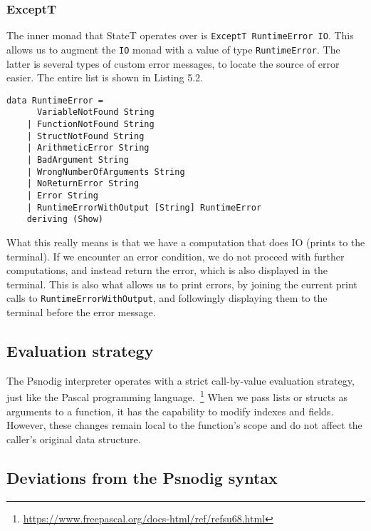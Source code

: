 \subsubsection{ExceptT}

The inner monad that StateT operates over is \texttt{ExceptT RuntimeError IO}. This allows us to augment the \texttt{IO} monad with a value of type \texttt{RuntimeError}. The latter is several types of custom error messages, to locate the source of error easier. The entire list is shown in Listing 5.2. \hfill \\

\begin{lstlisting}[caption={All error messages to be encountered in Psnodig}, captionpos=b]
data RuntimeError =
      VariableNotFound String
    | FunctionNotFound String
    | StructNotFound String
    | ArithmeticError String
    | BadArgument String
    | WrongNumberOfArguments String
    | NoReturnError String
    | Error String
    | RuntimeErrorWithOutput [String] RuntimeError
    deriving (Show)
\end{lstlisting}


What this really means is that we have a computation that does IO (prints to the terminal). If we encounter an error condition, we do not proceed with further computations, and instead return the error, which is also displayed in the terminal. This is also what allows us to print errors, by joining the current print calls to \texttt{RuntimeErrorWithOutput}, and followingly displaying them to the terminal before the error message.

\subsection{Evaluation strategy}

The Psnodig interpreter operates with a strict call-by-value evaluation strategy, just like the Pascal programming language.~\footnote{\url{https://www.freepascal.org/docs-html/ref/refsu68.html}} When we pass lists or structs as arguments to a function, it has the capability to modify indexes and fields. However, these changes remain local to the function's scope and do not affect the caller's original data structure.

\subsection{Deviations from the Psnodig syntax}

